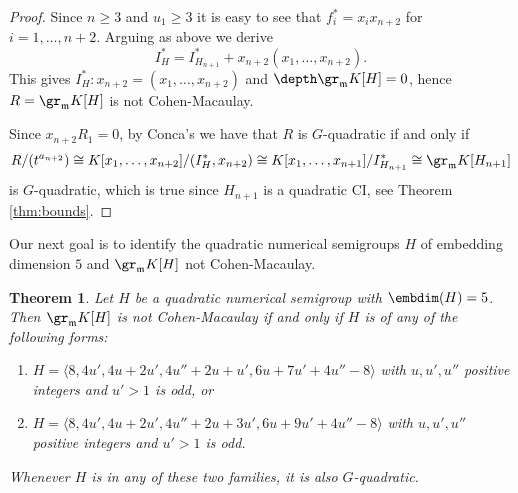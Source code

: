 \documentclass[12pt]{amsart}
\def\frk{\mathfrak}               %
\def\mm{{\frk m}}
\newtheorem{Theorem}{Theorem}[section]
\begin{document}
\begin{proof}
Since $n\geq 3$ and $u_1 \geq 3$ it is easy to see that $f_i^*=x_i x_{n+2}$ for $i=1,\dots, n+2$. Arguing as above we derive
$$
I_H^*=I_{H_{n+1}}^*+ x_{n+2}(x_1,\dots, x_{n+2}).
$$
This gives $I_H^*: x_{n+2}=(x_1,\dots, x_{n+2})$ and $\depth \gr_\mm K[H]=0$, hence  $ R=\gr_\mm K[H]$ is not Cohen-Macaulay. 


Since $x_{n+2} R_1=0$, by Conca's \cite[Lemma 4.(1)]{Conca-quadrics} we have that $ R$ is $G$-quadratic 
if and only if 
$$ R/(t^{a_{n+2}})\cong K[x_1,\dots, x_{n+2}]/(I^*_H, x_{n+2})\cong K[x_1, \dots, x_{n+1}]/I^*_{H_{n+1}} \cong \gr_\mm K[H_{n+1}]$$
is $G$-quadratic, which is true since $H_{n+1}$ is a quadratic CI, see Theorem \ref{thm:bounds}.
\end{proof}

\medskip

Our next goal is to identify the quadratic numerical semigroups $H$ of embedding dimension $5$  and $\gr_\mm K[H]$ not Cohen-Macaulay.
\begin{Theorem}
\label{thm:5-quad-non-cm} Let $H$ be a quadratic numerical semigroup with $\embdim(H)=5$.
Then $\gr_\mm K[H]$ is not Cohen-Macaulay if and only if $H$ is of any of the following forms:
\begin{enumerate}
\item[(i)] $H=\langle 8, 4u', 4u+2u', 4u''+2u+ u', 6u+7u'+4u''-8 \rangle$ with $u, u', u''$ positive integers and $u'>1$ is odd, or
\item[(ii)] $H=\langle 8, 4u', 4u+2u', 4u''+2u+3u', 6u+9u'+4u''-8 \rangle$ with $u, u', u''$ positive integers and $u'>1$ is odd.
\end{enumerate}
Whenever $H$ is in any of these two families, it is also $G$-quadratic.
\end{Theorem}
\end{document}
